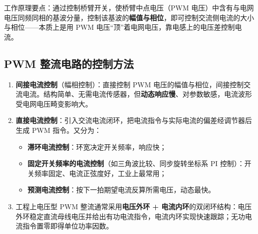 工作原理要点：通过控制桥臂开关，使桥臂中点电压（PWM 电压）中含有与电网电压同频同相的基波分量，控制该基波的\textbf{幅值与相位}，即可控制交流侧电流的大小与相位——本质上是用 PWM 电压“顶”着电网电压，靠电感上的电压差控制电流。

\subsection{PWM 整流电路的控制方法}

\begin{enumerate}
  \item \textbf{间接电流控制}（幅相控制）：直接控制 PWM 电压的幅值与相位，间接控制交流电流。结构简单、无需电流传感器，但\textbf{动态响应慢}、对参数敏感，电流波形受电网电压畸变影响大。
  \item \textbf{直接电流控制}：引入交流电流闭环，把电流指令与实际电流的偏差经调节器后生成 PWM 指令。又分为：
    \begin{itemize}
      \item \textbf{滞环电流控制}：环宽决定开关频率，响应快；
      \item \textbf{固定开关频率的电流控制}（如三角波比较、同步旋转坐标系 PI 控制）：开关频率固定、电流正弦度好，工业上最常用；
      \item \textbf{预测电流控制}：按下一拍期望电流反算所需电压，动态最快。
    \end{itemize}
  \item 工程上电压型 PWM 整流通常采用\textbf{电压外环 + 电流内环}的双闭环结构：电压外环稳定直流母线电压并给出有功电流指令，电流内环实现快速跟踪；无功电流指令置零即得单位功率因数。
\end{enumerate}

